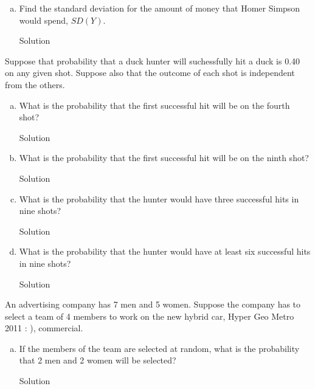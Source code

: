 \documentclass{article}
\begin{document}
\begin{spacing}{1.1}
\begin{homeworkProblem}
\begin{enumerate}[(a)]
\begin{homeworkSection}{Solution}
			\end{homeworkSection}
		\item  Find the standard deviation for the amount of money that Homer Simpson would spend, $SD(Y)$.
			\begin{homeworkSection}{Solution}
		
			\end{homeworkSection}
	\end{enumerate}
\end{homeworkProblem}
\begin{homeworkProblem}
	Suppose that probability that a duck hunter will suchessfully hit a duck is 0.40 on any given shot.  Suppose also that the outcome of each shot is independent from the others.  
	\begin{enumerate}[(a)]
		\item What is the probability that the first successful hit will be on the fourth shot?
			\begin{homeworkSection}{Solution}
		
			\end{homeworkSection}
		\item What is the probability that the first successful hit will be on the ninth shot?
			\begin{homeworkSection}{Solution}
		
			\end{homeworkSection}
		\item What is the probability that the hunter would have three successful hits in nine shots?
			\begin{homeworkSection}{Solution}
		
			\end{homeworkSection}
		\item What is the probability that the hunter would have at least six successful hits in nine shots?
			\begin{homeworkSection}{Solution}
		
			\end{homeworkSection}
	\end{enumerate}
\end{homeworkProblem}
\begin{homeworkProblem}
	An advertising company has 7 men and 5 women.  Suppose the company has to select a team of 4 members to work on the new hybrid car, Hyper Geo Metro 2011 : ), commercial.  
	\begin{enumerate}[(a)]
		\item If the members of the team are selected at random, what is the probability that 2 men and 2 women will be selected?
			\begin{homeworkSection}{Solution}
		

\end{homeworkSection}
\end{enumerate}
\end{homeworkProblem}
\end{spacing}
\end{document}
